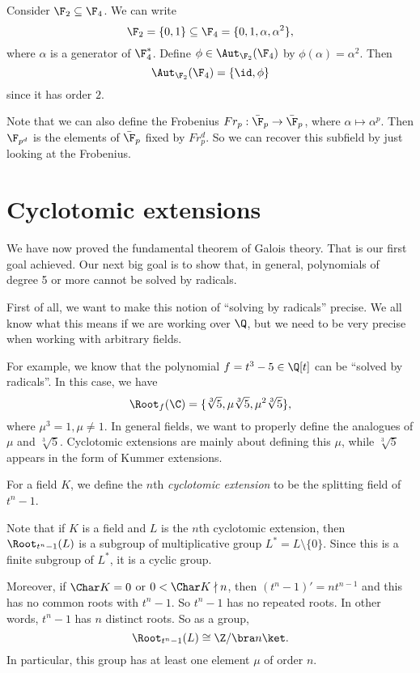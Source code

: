 \documentclass[a4paper]{article}
\begin{document}
\begin{eg}
  Consider $\F_2 \subseteq \F_4$. We can write
  \[
    \F_2 = \{0, 1\} \subseteq \F_4 = \{0, 1, \alpha, \alpha^2\},
  \]
  where $\alpha$ is a generator of $\F_4^*$. Define $\phi \in \Aut_{\F_2}(\F_4)$ by $\phi(\alpha) = \alpha^2$. Then
  \[
    \Aut_{\F_2}(\F_4) = \{\id, \phi\}
  \]
  since it has order $2$.
\end{eg}
Note that we can also define the Frobenius $Fr_p: \bar{\F}_p \to \bar{\F}_p$, where $\alpha \mapsto \alpha^p$. Then $\F_{p^d}$ is the elements of $\bar{\F}_p$ fixed by $Fr_p^d$. So we can recover this subfield by just looking at the Frobenius.

\section{Cyclotomic extensions}
We have now proved the fundamental theorem of Galois theory. That is our first goal achieved. Our next big goal is to show that, in general, polynomials of degree 5 or more cannot be solved by radicals.

First of all, we want to make this notion of ``solving by radicals'' precise. We all know what this means if we are working over $\Q$, but we need to be very precise when working with arbitrary fields.

For example, we know that the polynomial $f = t^3 - 5 \in \Q[t]$ can be ``solved by radicals''. In this case, we have
\[
  \Root_f(\C) = \{\sqrt[3]{5}, \mu \sqrt[3]{5}, \mu^2\sqrt[3]{5}\},
\]
where $\mu^3 = 1, \mu \not= 1$. In general fields, we want to properly define the analogues of $\mu$ and $\sqrt[3]{5}$. Cyclotomic extensions are mainly about defining this $\mu$, while $\sqrt[3]{5}$ appears in the form of Kummer extensions.

\begin{defi}
  For a field $K$, we define the $n$th \emph{cyclotomic extension} to be the splitting field of $t^n - 1$.
\end{defi}
Note that if $K$ is a field and $L$ is the $n$th cyclotomic extension, then $\Root_{t^n - 1}(L)$ is a subgroup of multiplicative group $L^* = L\setminus \{0\}$. Since this is a finite subgroup of $L^*$, it is a cyclic group.

Moreover, if $\Char K = 0$ or $0 < \Char K \nmid n$, then $(t^n - 1)' = nt^{n - 1}$ and this has no common roots with $t^n - 1$. So $t^n - 1$ has no repeated roots. In other words, $t^n - 1$ has $n$ distinct roots. So as a group,
\[
  \Root_{t^n - 1}(L) \cong \Z/\bra n\ket.
\]
In particular, this group has at least one element $\mu$ of order $n$.
\end{document}
